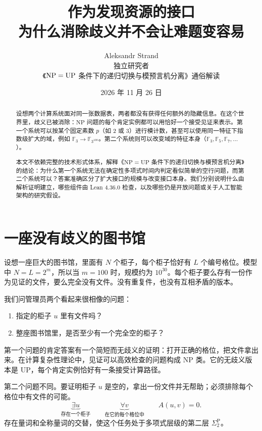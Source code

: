\documentclass[11pt,a4paper]{article}
\title{\textbf{作为发现资源的接口}\\[5pt]\large 为什么消除歧义并不会让难题变容易}
\author{Aleksandr Strand\\ \small 独立研究者\\
\small《$\NP=\UP$ 条件下的递归切换与模预言机分离》通俗解读}
\date{2026 年 11 月 26 日}
\newcommand{\F}{\mathbb F}
\newcommand{\NP}{\mathrm{NP}}
\newcommand{\UP}{\mathrm{UP}}
\begin{document}
\maketitle
\begin{abstract}
设想两个计算系统面对同一张数据表，两者都没有获得任何额外的隐藏信息。在这个世界里，歧义已被消除：$\NP$ 问题的每个肯定实例都可以用恰好一个接受见证来表示。第一个系统可以按某个固定素数 $p$（如 2 或 3）进行模计数，甚至可以使用同一特征下指数级扩大的域，例如 $\F_3\to\F_{3^{100}}$。第二个系统则可以改变域的特征本身（$\F_3,\F_5,\F_7,\ldots$）。

本文不依赖完整的技术形式体系，解释《$\NP=\UP$ 条件下的递归切换与模预言机分离》的结论：为什么第一个系统无法在确定性多项式时间内判定看似简单的空行问题，而第二个系统可以？答案准确区分了扩大接口的规模与改变接口本身。我们分别说明什么由解析证明建立，哪些组件由 Lean 4.36.0 检查，以及哪些仍是开放问题或关于人工智能架构的研究假设。
\end{abstract}

\section{一座没有歧义的图书馆}
设想一座巨大的图书馆，里面有 $N$ 个柜子，每个柜子恰好有 $L$ 个编号格位。模型中 $N=L=2^m$，所以当 $m=100$ 时，规模约为 $10^{30}$。每个柜子要么存有一份作为见证的文件，要么完全没有文件。没有重复件，也没有互相矛盾的版本。

我们问管理员两个看起来很相像的问题：
\begin{enumerate}
\item 指定的柜子 $u$ 里有文件吗？
\item 整座图书馆里，是否至少有一个完全空的柜子？
\end{enumerate}
第一个问题的肯定答案有一个简短而无歧义的证明：打开正确的格位，把文件拿出来。在计算复杂性理论中，见证可以高效检查的问题构成 $\NP$ 类。它的无歧义版本是 $\UP$，每个肯定实例恰好有一条接受计算路径。

第二个问题不同。要证明柜子 $u$ 是空的，拿出一份文件并无帮助；必须排除每个格位中有文件的可能。
\[
 \underbrace{\exists u}_{\text{存在一个柜子}}\qquad
 \underbrace{\forall v}_{\text{在它的每个格位中}}\qquad A(u,v)=0.
\]
存在量词和全称量词的交替，使这个任务处于多项式层级的第二层 $\Sigma_2^{\mathrm P}$。
\end{document}
